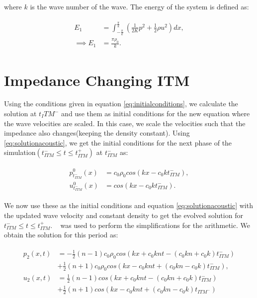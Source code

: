 where $k$ is the wave number of the wave. The energy of the system is defined as:

\begin{align}
    \begin{split}
     E_1 &= \int_{-\frac{\pi}{k}}^{\frac{\pi}{k}} \left(\frac{1}{2K}p^2 + \frac{1}{2}\rho u^2\right) dx , \\
     \implies E_1 &= \frac{\pi\rho_0}{k} .
    \end{split}
    \label{eq:energy}
\end{align}

\section{Impedance Changing \ac{ITM}}\label{section:impedanceconstantITM}
Using the conditions given in equation \ref{eq:initialconditions}, we calculate the solution at $t_ITM^-$ and use them as initial conditions for the new equation where the wave velocities are scaled.
In this case, we scale the velocities such that the impedance also changes(keeping the density constant). Using \ref{eq:solutionacoustic}, we get the initial conditions for the next phase of the simulation$\left(t_{ITM}^- \leq t \leq t_{ITM}^+ \right)$ at $t_{ITM}^-$ as:

\begin{align}
    \begin{split}
        p^0_{t_{ITM}^-}\left(x\right) &= c_0 \rho_0 cos\left(kx - c_0kt_{ITM}^-\right), \\
        u^0_{t_{ITM}^-}\left(x\right) &= cos\left(kx - c_0kt_{ITM}^-\right) .
    \end{split}
\end{align}

We now use these as the initial conditions and equation \ref{eq:solutionacoustic} with the updated wave velocity and constant density to get the evolved solution for $t_{ITM}^- \leq t \leq t_{ITM}^+ $. ~\parencite{sagemath} was used to perform the simplifications for the arithmetic. We obtain the solution for this period as:

\begin{align}
    \begin{split}
        p_{2}\left(x, t\right) &= -\frac{1}{2} \left(n-1\right)c_0\rho_0cos\left(kx + c_0knt - \left(c_0kn + c_0k\right)t_{ITM}^-\right) \\
        &+ \frac{1}{2} \left(n+1\right)c_0\rho_0cos\left(kx - c_0knt + \left(c_0kn - c_0k\right)t_{ITM}^-\right), \\
        u_{2}\left(x, t\right) &= \frac{1}{2}\left(n-1\right)cos\left(kx + c_0knt - \left(c_0kn + c_0k\right)t_{ITM}^-\right)\\
        &+ \frac{1}{2}\left(n+1\right)cos\left(kx - c_0knt + \left(c_0kn-c_0k\right)t_{ITM^-}\right)
    \end{split}
\end{align}

